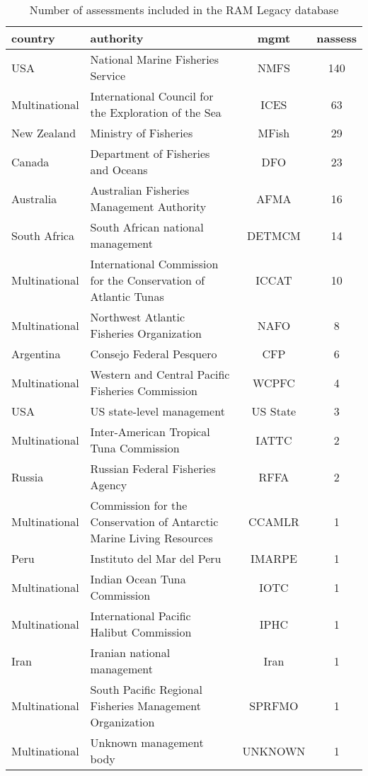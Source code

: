 \begin{table}[ht]
\begin{center}
\caption{Number of assessments included in the RAM Legacy database}
\label{tab:mgmt}
\begin{tabular}{p{3cm}p{5cm}cc}
  \hline
country & authority & mgmt & nassess \\ 
  \hline
USA & National Marine Fisheries Service & NMFS & 140 \\ 
  Multinational & International Council for the Exploration of the Sea & ICES &  63 \\ 
  New Zealand & Ministry of Fisheries & MFish &  29 \\ 
  Canada & Department of Fisheries and Oceans & DFO &  23 \\ 
  Australia & Australian Fisheries Management Authority & AFMA &  16 \\ 
  South Africa & South African national management & DETMCM &  14 \\ 
  Multinational & International Commission for the Conservation of Atlantic Tunas & ICCAT &  10 \\ 
  Multinational & Northwest Atlantic Fisheries Organization & NAFO &   8 \\ 
  Argentina & Consejo Federal Pesquero & CFP &   6 \\ 
  Multinational & Western and Central Pacific Fisheries Commission & WCPFC &   4 \\ 
  USA & US state-level management & US State &   3 \\ 
  Multinational & Inter-American Tropical Tuna Commission & IATTC &   2 \\ 
  Russia & Russian Federal Fisheries Agency & RFFA &   2 \\ 
  Multinational & Commission for the Conservation of Antarctic Marine Living Resources & CCAMLR &   1 \\ 
  Peru & Instituto del Mar del Peru & IMARPE &   1 \\ 
  Multinational & Indian Ocean Tuna Commission & IOTC &   1 \\ 
  Multinational & International Pacific Halibut Commission & IPHC &   1 \\ 
  Iran & Iranian national management & Iran &   1 \\ 
  Multinational & South Pacific Regional Fisheries Management Organization & SPRFMO &   1 \\ 
  Multinational & Unknown management body & UNKNOWN &   1 \\ 
   \hline
\end{tabular}
\end{center}
\end{table}
